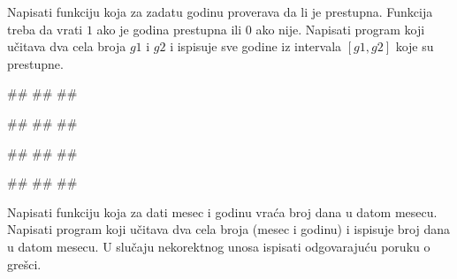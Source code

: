 \begin{Exercise}[label=p1.4_07] 
Napisati funkciju  koja za zadatu
godinu proverava da li je prestupna. Funkcija treba da vrati $1$ ako
je godina prestupna ili $0$ ako nije. Napisati program koji učitava
dva cela broja $g1$ i $g2$ i ispisuje sve godine iz intervala $[g1,
  g2]$ koje su prestupne.
 
\begin{miditest}
\begin{upotreba}{1}
#\naslovInt#
##
##
\end{upotreba}
\end{miditest}
\begin{miditest}
\begin{upotreba}{2}
#\naslovInt#
##
##
\end{upotreba}
\end{miditest}

\begin{miditest}
\begin{upotreba}{3}
#\naslovInt#
##
##
\end{upotreba}
\end{miditest}
\begin{miditest}
\begin{upotreba}{4}
#\naslovInt#
##
##
\end{upotreba}
\end{miditest}
\end{Exercise}
\begin{Answer}[ref=p1.4_07]
\end{Answer}


\begin{Exercise}[label=p1.4_] 
Napisati funkciju  koja
za dati mesec i godinu vraća broj dana u datom mesecu. Napisati
program koji učitava dva cela broja (mesec i godinu) i ispisuje broj
dana u datom mesecu. U slučaju nekorektnog unosa ispisati odgovarajuću
poruku o grešci.

\end{Exercise}
\begin{Answer}[ref=p1.4_]
\end{Answer}

